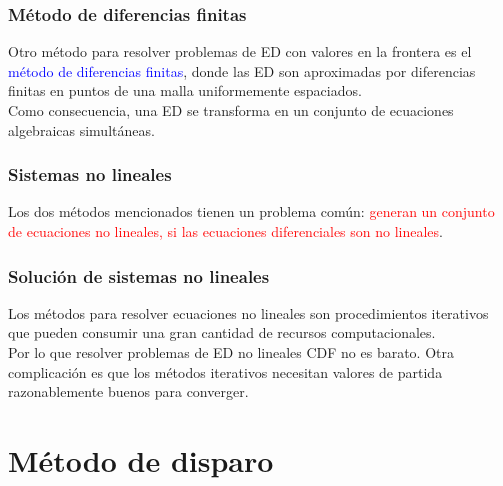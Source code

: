 \begin{frame}
\frametitle{Método de diferencias finitas}
Otro método para resolver problemas de ED con valores en la frontera es el \textcolor{blue}{método de diferencias finitas}, donde las ED son aproximadas por diferencias finitas en puntos de una malla uniformemente espaciados.
\\
\bigskip
Como consecuencia, una ED se transforma en un conjunto de ecuaciones algebraicas simultáneas.
\end{frame}
\begin{frame}
\frametitle{Sistemas no lineales}
Los dos métodos mencionados tienen un problema común: \textcolor{red}{generan un conjunto de ecuaciones no lineales, si las ecuaciones diferenciales son no lineales}.
\end{frame}
\begin{frame}
\frametitle{Solución de sistemas no lineales}
Los métodos para resolver ecuaciones no lineales son procedimientos iterativos que pueden consumir una gran cantidad de recursos computacionales.
\\
\bigskip
Por lo que resolver problemas de ED no lineales CDF no es barato. Otra complicación es que los métodos iterativos necesitan valores de partida razonablemente buenos para converger. 
\end{frame}
\section{Método de disparo}
